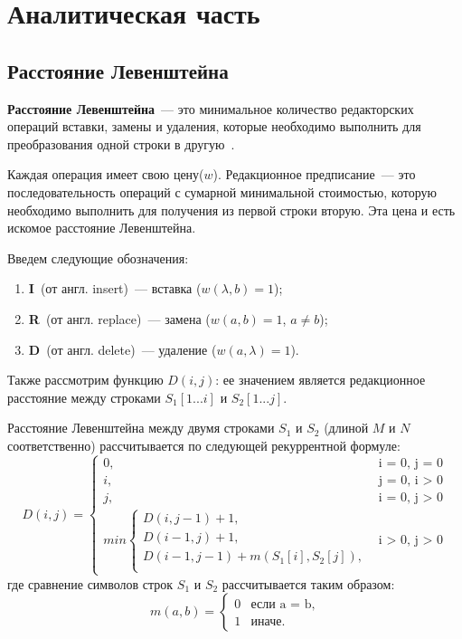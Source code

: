 \chapter{Аналитическая часть}
\section{Расстояние Левенштейна}

\textbf{Расстояние Левенштейна}~--- это минимальное количество редакторских операций вставки, замены и удаления, которые необходимо выполнить для преобразования одной строки в другую~\cite{levenshtein}. 

Каждая операция имеет свою цену($w$). Редакционное предписание~--- это последовательность операций с сумарной минимальной стоимостью, которую необходимо выполнить для получения из первой строки вторую. Эта цена и есть искомое расстояние Левенштейна.

Введем следующие обозначения:
\begin{enumerate}[label=\arabic*)]
    \item \textbf{I}~(от англ. insert)~--- вставка ($w(\lambda, b) = 1$);
    \item \textbf{R}~(от англ. replace)~--- замена ($w(a, b) = 1$, $a \neq b$);
    \item \textbf{D}~(от англ. delete)~--- удаление ($w(a, \lambda) = 1$).
\end{enumerate}

Также рассмотрим функцию $D(i, j)$: ее значением является
редакционное расстояние между строками $S_1[1...i]$ и $S_2[1...j]$.

Расстояние Левенштейна между двумя строками $S_{1}$ и $S_{2}$ (длиной $M$ и $N$ соответственно) рассчитывается по следующей рекуррентной формуле:
\begin{equation}
	\label{eq:L}
	D(i, j) =
	\begin{cases}
		0, &\text{i = 0, j = 0}\\
		i, &\text{j = 0, i > 0}\\
		j, &\text{i = 0, j > 0}\\
		min \begin{cases}
			D(i, j - 1) + 1,\\
			D(i - 1, j) + 1,\\
			D(i - 1, j - 1) +  m(S_{1}[i], S_{2}[j]), \\
		\end{cases}
		&\text{i > 0, j > 0}
	\end{cases}
\end{equation}
где сравнение символов строк $S_1$ и $S_2$ рассчитывается таким образом:
\begin{equation}
	\label{eq:m}
	m(a, b) = \begin{cases}
		0 &\text{если a = b,}\\
		1 &\text{иначе.}
	\end{cases}
\end{equation}

